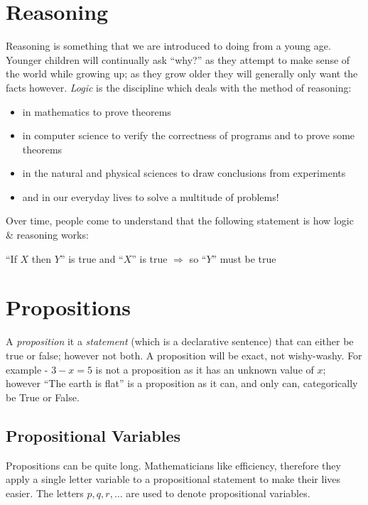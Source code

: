 
\section{Reasoning}
Reasoning is something that we are introduced to doing from a young age. Younger children will continually ask ``why?'' as they attempt to make sense of the world while growing up; as they grow older they will generally only want the facts however. \textit{Logic} is the discipline which deals with the method of reasoning:
\begin{itemize}
    \item in mathematics to prove theorems
    \item in computer science to verify the correctness of programs and to prove some theorems
    \item in the natural and physical sciences to draw conclusions from experiments
    \item and in our everyday lives to solve a multitude of problems!
\end{itemize}
Over time, people come to understand that the following statement is how logic \& reasoning works:
\begin{center}
    ``If $X$ then $Y$'' is true and ``$X$'' is true $\Rightarrow$ so ``$Y$'' must be true
\end{center}

\section{Propositions}
A \textit{proposition} it a \textit{statement} (which is a declarative sentence) that can either be true or false; however not both. A proposition will be exact, not wishy-washy. For example - $3-x=5$ is not a proposition as it has an unknown value of $x$; however ``The earth is flat'' is a proposition as it can, and only can, categorically be True or False.\\

\subsection{Propositional Variables}
Propositions can be quite long. Mathematicians like efficiency, therefore they apply a single letter variable to a propositional statement to make their lives easier. The letters $p, q, r, \ldots$ are used to denote propositional variables.\\

